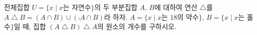 전체집합 $U=\{x \mid x$는 자연수$\}$의 두 부분집합 $A$, $B$에 대하여 연산 $\triangle$를 $A\mathbin{\triangle}B=(A\cap B)\cup(\comp{A}\cap B)$라 하자. $A=\{x \mid x$는 $18$의 약수$\}$, $B=\{x \mid x$는 홀수$\}$일 때, 집합 $(A\mathbin{\triangle}B)\mathbin{\triangle}A$의 원소의 개수를 구하시오.
